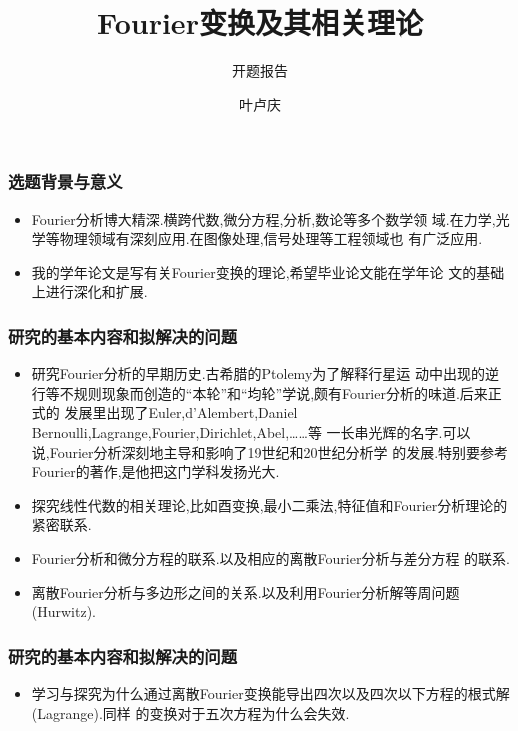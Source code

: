 \documentclass{beamer}
\begin{document}
\title{Fourier变换及其相关理论} \subtitle{开题报告}
\author{叶卢庆}
\begin{frame}
  \titlepage
\end{frame}
\begin{frame}
  \frametitle{选题背景与意义}
  \begin{itemize}
  \item Fourier分析博大精深.横跨代数,微分方程,分析,数论等多个数学领
    域.在力学,光学等物理领域有深刻应用.在图像处理,信号处理等工程领域也
    有广泛应用.\pause
  \item 我的学年论文是写有关Fourier变换的理论,希望毕业论文能在学年论
    文的基础上进行深化和扩展.
  \end{itemize}
\end{frame}
\begin{frame}
  \frametitle{研究的基本内容和拟解决的问题}
  \begin{itemize}
\item 研究Fourier分析的早期历史.古希腊的Ptolemy为了解释行星运
  动中出现的逆行等不规则现象而创造的“本轮”和“均轮”学说,颇有Fourier分析的味道.后来正式的
  发展里出现了Euler,d'Alembert,Daniel Bernoulli,Lagrange,Fourier,Dirichlet,Abel,……等
  一长串光辉的名字.可以说,Fourier分析深刻地主导和影响了19世纪和20世纪分析学
  的发展.特别要参考Fourier的著作,是他把这门学科发扬光大.\pause
\item 探究线性代数的相关理论,比如酉变换,最小二乘法,特征值和Fourier分析理论的
  紧密联系.\pause
\item Fourier分析和微分方程的联系.以及相应的离散Fourier分析与差分方程
  的联系.\pause
\item 离散Fourier分析与多边形之间的关系.以及利用Fourier分析解等周问题(Hurwitz).
  \end{itemize}
\end{frame}
\begin{frame}
  \frametitle{研究的基本内容和拟解决的问题}
\begin{itemize}
  \item 学习与探究为什么通过离散Fourier变换能导出四次以及四次以下方程的根式解(Lagrange).同样
  的变换对于五次方程为什么会失效.
\end{itemize}
\end{frame}
\end{document}
